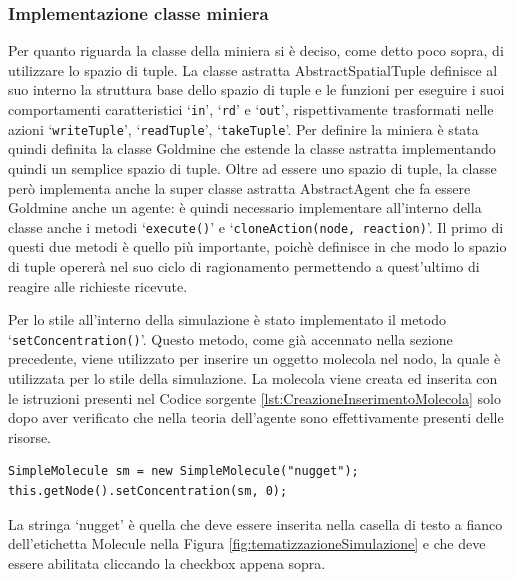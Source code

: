 \subsubsection{Implementazione classe miniera}
Per quanto riguarda la classe della miniera si è deciso, come detto poco sopra, di utilizzare lo spazio di tuple. La classe astratta AbstractSpatialTuple definisce al suo interno la struttura base dello spazio di tuple e le funzioni per eseguire i suoi comportamenti caratteristici `\texttt{in}', `\texttt{rd}' e `\texttt{out}', rispettivamente trasformati nelle azioni `\texttt{writeTuple}', `\texttt{readTuple}', `\texttt{takeTuple}'.
Per definire la miniera è stata quindi definita la classe Goldmine che estende la classe astratta implementando quindi un semplice spazio di tuple.
Oltre ad essere uno spazio di tuple, la classe però implementa anche la super classe astratta AbstractAgent che fa essere Goldmine anche un agente: è quindi necessario implementare all'interno della classe anche i metodi `\texttt{execute()}' e `\texttt{cloneAction(node, reaction)}'. Il primo di questi due metodi è quello più importante, poichè definisce in che modo lo spazio di tuple opererà nel suo ciclo di ragionamento permettendo a quest'ultimo di reagire alle richieste ricevute.

Per lo stile all'interno della simulazione è stato implementato il metodo `\texttt{setCon\-cen\-tra\-tion()}'. Questo metodo, come già accennato nella sezione precedente, viene utilizzato per inserire un oggetto molecola nel nodo, la quale è utilizzata per lo stile della simulazione. La molecola viene creata ed inserita con le istruzioni presenti nel Codice sorgente \ref{lst:CreazioneInserimentoMolecola} solo dopo aver verificato che nella teoria dell'agente sono effettivamente presenti delle risorse.

\switchToJava{}{}
\begin{lstlisting}[float,firstnumber=1,label={lst:CreazioneInserimentoMolecola},caption={Creazione e inserimento molecola}]
SimpleMolecule sm = new SimpleMolecule("nugget");
this.getNode().setConcentration(sm, 0);
\end{lstlisting}
La stringa `nugget' è quella che deve essere inserita nella casella di testo a fianco dell'etichetta Molecule nella Figura \ref{fig:tematizzazioneSimulazione} e che deve essere abilitata cliccando la checkbox appena sopra.

\paragraph*{}


